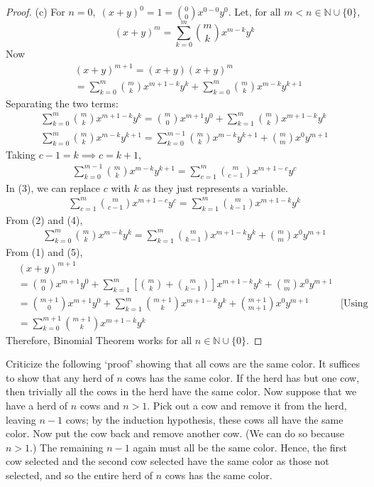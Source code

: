 \documentclass[12pt]{article}
\newenvironment{problem}[2][Problem]{\begin{trivlist}
\item[\hskip \labelsep {\bfseries #1}\hskip \labelsep {\bfseries #2.}]}{\end{trivlist}}
\begin{document}
\begin{proof}
(c) For $n = 0, \; (x + y)^0 = 1 = \binom{0}{0}x^{0-0}y^0$. Let, $\text{for all } m < n \in {\mathbb{N}} \cup \{0\}$,
\[
(x + y)^m = \sum_{k=0}^{m} \binom{m}{k} x^{m-k} y^k
\]
Now
\begin{align*}
& (x + y)^{m+1} = (x+y)(x+y)^m \\
& = \sum_{k=0}^m \binom{m}{k}x^{m+1-k}y^{k} + \sum_{k=0}^m \binom{m}{k} x^{m-k}y^{k+1}
\end{align*}
Separating the two terms:
\begin{align}
\sum_{k=0}^m \binom{m}{k} x^{m+1-k} y^k = \binom{m}{0} x^{m+1} y^0 + \sum_{k=1}^m \binom{m}{k} x^{m+1-k} y^k \\
\sum_{k=0}^m \binom{m}{k} x^{m-k} y^{k+1} = \sum_{k=0}^{m-1} \binom{m}{k} x^{m-k} y^{k+1} + \binom{m}{m} x^0 y^{m+1}
\end{align}
Taking $c-1 = k \implies c = k+1$,
\begin{align}
\sum_{k=0}^{m-1} \binom{m}{k} x^{m-k} y^{k+1} = \sum_{c=1}^m \binom{m}{c-1} x^{m+1-c} y^c
\end{align}
In (3), we can replace $c$ with $k$ as they just represents a variable.
\begin{align}
\sum_{c=1}^m \binom{m}{c-1} x^{m+1-c} y^c = \sum_{k=1}^m \binom{m}{k-1} x^{m+1-k} y^k
\end{align}
From (2) and (4),
\begin{align}
\sum_{k=0}^m \binom{m}{k} x^{m-k} y^{k} = \sum_{k=1}^m \binom{m}{k-1} x^{m+1-k} y^{k} + \binom{m}{m} x^0 y^{m+1}
\end{align}
From (1) and (5),
\begin{align*}
& (x + y)^{m+1} \\
& = \binom{m}{0} x^{m+1} y^0 + \sum_{k=1}^m \left[ \binom{m}{k} + \binom{m}{k-1} \right]x^{m+1-k} y^k + \binom{m}{m} x^0 y^{m+1} \\
& = \binom{m+1}{0} x^{m+1} y^0 + \sum_{k=1}^m \binom{m+1}{k} x^{m+1-k} y^k + \binom{m+1}{m+1} x^0 y^{m+1} & \text{[Using (a) and parts (b)]} \\
& = \sum_{k=0}^{m+1} \binom{m+1}{k} x^{m+1-k} y^k
\end{align*}
Therefore, Binomial Theorem works $\text{for all } n \in {\mathbb{N}}\cup \{0\}$.

\end{proof}

\begin{problem}{15}
Criticize the following `proof' showing that all cows are the same color. It suffices to show that any herd of \( n \) cows has the same color. If the herd has but one cow, then trivially all the cows in the herd have the same color. Now suppose that we have a herd of \( n \) cows and \( n > 1 \). Pick out a cow and remove it from the herd, leaving \( n - 1 \) cows; by the induction hypothesis, these cows all have the same color. Now put the cow back and remove another cow. (We can do so because \( n > 1 \).) The remaining \( n - 1 \) again must all be the same color. Hence, the first cow selected and the second cow selected have the same color as those not selected, and so the entire herd of \( n \) cows has the same color.

\end{problem}
\end{document}
